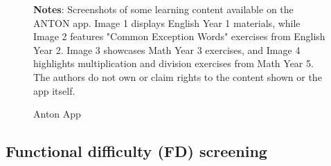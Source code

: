 \documentclass[hidelinks,12pt]{article}
\begin{document}
\begin{singlespace}
\begin{figure}[H]
\centering
\caption{Anton App}\label{fig:intervention_anton}
\begin{minipage}{0.98\linewidth}
\vspace{3pt}
\footnotesize{\justify\textbf{Notes}: Screenshots of some learning content available on the ANTON app. Image 1 displays English Year 1 materials, while Image 2 features "Common Exception Words" exercises from English Year 2. Image 3 showcases Math Year 3 exercises, and Image 4 highlights multiplication and division exercises from Math Year 5. The authors do not own or claim rights to the content shown or the app itself.}
\end{minipage}
\end{figure}
\end{singlespace}


\subsection{Functional difficulty (FD) screening}

\begingroup
\setlength{\tabcolsep}{2pt}  %
\begin{table}[H]
   \begin{singlespace}
    \centering
    \fontsize{12pt}{12pt}\selectfont  %
    \end{singlespace}
\end{table}
\endgroup
\end{document}
